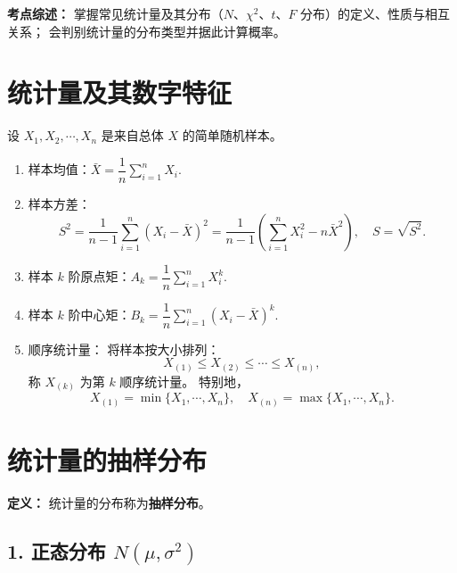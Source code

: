 
\textbf{考点综述：}
掌握常见统计量及其分布（$N$、$\chi^2$、$t$、$F$ 分布）的定义、性质与相互关系；
会判别统计量的分布类型并据此计算概率。


\section{统计量及其数字特征}

设 $X_1, X_2, \cdots, X_n$ 是来自总体 $X$ 的简单随机样本。

\begin{enumerate}
      \item 样本均值：\quad $\bar{X} = \dfrac{1}{n} \sum_{i=1}^{n} X_i.$
      \item 样本方差：
            $$
                  S^2 = \frac{1}{n-1}\sum_{i=1}^{n}(X_i - \bar{X})^2
                  = \frac{1}{n-1}\left(\sum_{i=1}^{n} X_i^2 - n\bar{X}^2\right),
                  \quad S = \sqrt{S^2}.
            $$
      \item 样本 $k$ 阶原点矩：\quad $A_k = \dfrac{1}{n} \sum_{i=1}^{n} X_i^k.$
      \item 样本 $k$ 阶中心矩：\quad $B_k = \dfrac{1}{n} \sum_{i=1}^{n}(X_i - \bar{X})^k.$
      \item 顺序统计量：\quad
            将样本按大小排列：
            $$
                  X_{(1)} \le X_{(2)} \le \cdots \le X_{(n)},
            $$
            称 $X_{(k)}$ 为第 $k$ 顺序统计量。
            特别地，
            $$
                  X_{(1)} = \min\{X_1, \cdots, X_n\}, \quad
                  X_{(n)} = \max\{X_1, \cdots, X_n\}.
            $$
\end{enumerate}


\section{统计量的抽样分布}

\textbf{定义：}
统计量的分布称为\textbf{抽样分布}。


\subsection*{1. 正态分布 $N(\mu,\sigma^2)$}

